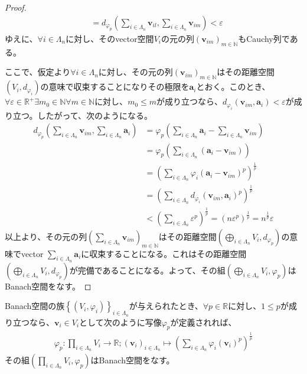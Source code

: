 \documentclass[dvipdfmx]{jsarticle}
\begin{document}
\begin{proof}
\begin{align*}
&= d_{\varphi_{p}}\left( \sum_{i \in \varLambda_{n}} \mathbf{v}_{il},\sum_{i \in \varLambda_{n}} \mathbf{v}_{im} \right) < \varepsilon
\end{align*}
ゆえに、$\forall i \in \varLambda_{n}$に対し、そのvector空間$V_{i}$の元の列$\left( \mathbf{v}_{im} \right)_{m \in \mathbb{N}}$もCauchy列である。\par
ここで、仮定より$\forall i \in \varLambda_{n}$に対し、その元の列$\left( \mathbf{v}_{im} \right)_{m \in \mathbb{N}}$はその距離空間$\left( V_{i},d_{\varphi_{i}} \right)$の意味で収束することになりその極限を$\mathbf{a}_{i}$とおく。このとき、$\forall\varepsilon \in \mathbb{R}^{+}\exists m_{0} \in \mathbb{N}\forall m \in \mathbb{N}$に対し、$m_{0} \leq m$が成り立つなら、$d_{\varphi_{i}}\left( \mathbf{v}_{im},\mathbf{a}_{i} \right) < \varepsilon$が成り立つ。したがって、次のようになる。
\begin{align*}
d_{\varphi_{p}}\left( \sum_{i \in \varLambda_{n}} \mathbf{v}_{im},\sum_{i \in \varLambda_{n}} \mathbf{a}_{i} \right) &= \varphi_{p}\left( \sum_{i \in \varLambda_{n}} \mathbf{a}_{i} - \sum_{i \in \varLambda_{n}} \mathbf{v}_{im} \right)\\
&= \varphi_{p}\left( \sum_{i \in \varLambda_{n}} \left( \mathbf{a}_{i} - \mathbf{v}_{im} \right) \right)\\
&= \left( \sum_{i \in \varLambda_{n}} {\varphi_{i}\left( \mathbf{a}_{i} - \mathbf{v}_{im} \right)}^{p} \right)^{\frac{1}{p}}\\
&= \left( \sum_{i \in \varLambda_{n}} {d_{\varphi_{i}}\left( \mathbf{v}_{im},\mathbf{a}_{i} \right)}^{p} \right)^{\frac{1}{p}}\\
&< \left( \sum_{i \in \varLambda_{n}} \varepsilon^{p} \right)^{\frac{1}{p}} = \left( n\varepsilon^{p} \right)^{\frac{1}{p}} = n^{\frac{1}{p}}\varepsilon
\end{align*}
以上より、その元の列$\left( \sum_{i \in \varLambda_{n}} \mathbf{v}_{im} \right)_{m \in \mathbb{N}}$はその距離空間$\left( \bigoplus_{i \in \varLambda_{n}} V_{i},d_{\varphi_{p}} \right)$の意味でvector
$\sum_{i \in \varLambda_{n}} \mathbf{a}_{i}$に収束することになる。これはその距離空間$\left( \bigoplus_{i \in \varLambda_{n}} V_{i},d_{\varphi_{p}} \right)$が完備であることになる。よって、その組$\left( \bigoplus_{i \in \varLambda_{n}} V_{i},\varphi_{p} \right)$はBanach空間をなす。
\end{proof}
\begin{thm}\label{2.3.1.13}
Banach空間の族$\left\{ \left( V_{i},\varphi_{i} \right) \right\}_{i \in \varLambda_{n}}$が与えられたとき、$\forall p \in \mathbb{R}$に対し、$1 \leq p$が成り立つなら、$\mathbf{v}_{i} \in V_{i}$として次のように写像$\varphi_{p}$が定義されれば、
\begin{align*}
\varphi_{p}:\prod_{i \in \varLambda_{n}} V_{i} \rightarrow \mathbb{R};\left( \mathbf{v}_{i} \right)_{i \in \varLambda_{n}} \mapsto \left( \sum_{i \in \varLambda_{n}} {\varphi_{i}\left( \mathbf{v}_{i} \right)}^{p} \right)^{\frac{1}{p}}
\end{align*}
その組$\left( \prod_{i \in \varLambda_{n}} V_{i},\varphi_{p} \right)$はBanach空間をなす。
\end{thm}
\end{document}
